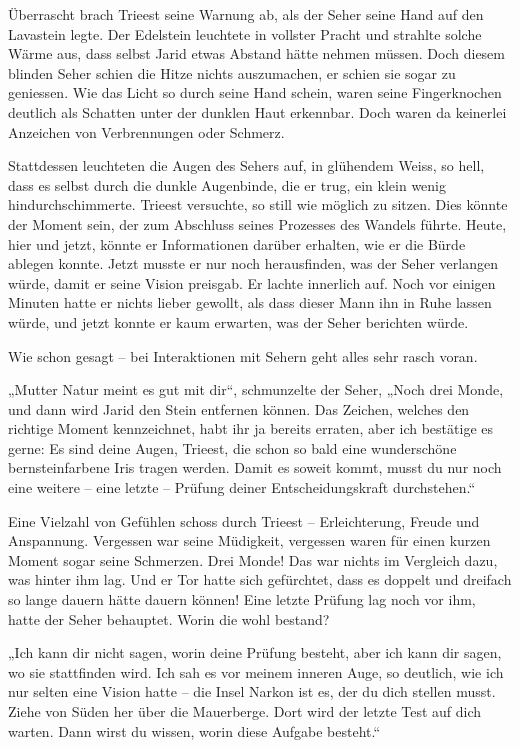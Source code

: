 Überrascht brach Trieest seine Warnung ab, als der Seher seine Hand auf den Lavastein legte. Der Edelstein leuchtete in vollster Pracht und strahlte solche Wärme aus, dass selbst Jarid etwas Abstand hätte nehmen müssen. Doch diesem blinden Seher schien die Hitze nichts auszumachen, er schien sie sogar zu geniessen. Wie das Licht so durch seine Hand schein, waren seine Fingerknochen deutlich als Schatten unter der dunklen Haut erkennbar. Doch waren da keinerlei Anzeichen von Verbrennungen oder Schmerz.

Stattdessen leuchteten die Augen des Sehers auf, in glühendem Weiss, so hell, dass es selbst durch die dunkle Augenbinde, die er trug, ein klein wenig hindurchschimmerte. Trieest versuchte, so still wie möglich zu sitzen. Dies könnte der Moment sein, der zum Abschluss seines Prozesses des Wandels führte. Heute, hier und jetzt, könnte er Informationen darüber erhalten, wie er die Bürde ablegen konnte. Jetzt musste er nur noch herausfinden, was der Seher verlangen würde, damit er seine Vision preisgab. Er lachte innerlich auf. Noch vor einigen Minuten hatte er nichts lieber gewollt, als dass dieser Mann ihn in Ruhe lassen würde, und jetzt konnte er kaum erwarten, was der Seher berichten würde.

Wie schon gesagt – bei Interaktionen mit Sehern geht alles sehr rasch voran.\bigskip



„Mutter Natur meint es gut mit dir“, schmunzelte der Seher, „Noch drei Monde, und dann wird Jarid den Stein entfernen können. Das Zeichen, welches den richtige Moment kennzeichnet, habt ihr ja bereits erraten, aber ich bestätige es gerne: Es sind deine Augen, Trieest, die schon so bald eine wunderschöne bernsteinfarbene Iris tragen werden. Damit es soweit kommt, musst du nur noch eine weitere – eine letzte – Prüfung deiner Entscheidungskraft durchstehen.“

Eine Vielzahl von Gefühlen schoss durch Trieest – Erleichterung, Freude und Anspannung. Vergessen war seine Müdigkeit, vergessen waren für einen kurzen Moment sogar seine Schmerzen. Drei Monde! Das war nichts im Vergleich dazu, was hinter ihm lag. Und er Tor hatte sich gefürchtet, dass es doppelt und dreifach so lange dauern hätte dauern können! Eine letzte Prüfung lag noch vor ihm, hatte der Seher behauptet. Worin die wohl bestand?

„Ich kann dir nicht sagen, worin deine Prüfung besteht, aber ich kann dir sagen, wo sie stattfinden wird. Ich sah es vor meinem inneren Auge, so deutlich, wie ich nur selten eine Vision hatte – die Insel Narkon ist es, der du dich stellen musst. Ziehe von Süden her über die Mauerberge. Dort wird der letzte Test auf dich warten. Dann wirst du wissen, worin diese Aufgabe besteht.“

